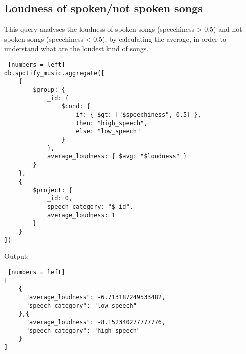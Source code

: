 \subsection{Loudness of spoken/not spoken songs}
This query analyses the loudness of spoken songs (speechiness > 0.5) and not spoken songs (speechiness < 0.5), by calculating the average, in order to understand what are the loudest kind of songs.\\

\begin{algorithm}[ht]
\caption{Loudness of spoken/not spoken songs}
\begin{lstlisting} [numbers = left]
db.spotify_music.aggregate([
    {
        $group: {
            _id: {
                $cond: {
                    if: { $gt: ["$speechiness", 0.5] },
                    then: "high_speech",
                    else: "low_speech"
                }
            },
            average_loudness: { $avg: "$loudness" }
        }
    },
    {
        $project: {
            _id: 0,
            speech_category: "$_id",
            average_loudness: 1
        }
    }
])
\end{lstlisting}
\end{algorithm}
\newpage

Output:
\begin{algorithm}[h!]
\caption{Output loudness of each category}
\begin{lstlisting} [numbers = left]
[
	{
      "average_loudness": -6.713187249533482,
      "speech_category": "low_speech"
    },{
      "average_loudness": -8.152340277777776,
      "speech_category": "high_speech"
    }
]
\end{lstlisting}
\end{algorithm}